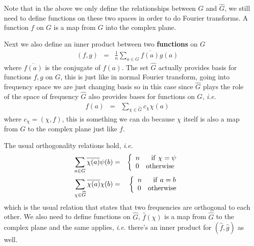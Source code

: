 \documentclass[aps,preprint,preprintnumbers,nofootinbib,showpacs,prd]{revtex4-1}
\newcommand{\ie}{{\it i.e.} }
\newcommand{\nbea}{\begin{eqnarray*}}
\newcommand{\neea}{\end{eqnarray*}}
\begin{document}
Note that in the above we only define the relationships between $G$ and $\widehat G$, we still need to define functions on these two spaces in order to do Fourier transforms. A function $f$ on $G$ is a map from $G$ into the complex plane.

Next we also define an inner product between two {\bf functions} on $G$
%
\nbea
(f,g) & = & \frac{1}{n} \sum_{a\in G} \overline{f(a)}g(a)
\neea
%
where $\overline{f(a)}$ is the conjugate of $f(a)$. The set $\widehat G$ actually provides basis for functions $f, g$ on $G$, this is just like in normal Fourier transform, going into frequency space we are just changing basis so in this case since $\widehat G$ plays the role of the space of frequency $\widehat G$ also provides bases for functions on $G$, \ie
%
\nbea
f(a) & = & \sum_{\chi \in \widehat G} c_\chi \chi(a)
\neea
%
where $c_\chi = (\chi, f)$, this is something we can do because $\chi$ itself is also a map from $G$ to the complex plane just like $f$.

The usual orthogonality relations hold, \ie
%
\nbea
\sum_{a\in G} \overline{\chi(a)} \psi(b) & = & \left \{
\begin{array}{l}
n {\rm ~~~~~if~} \chi=\psi \\
0~~~{\rm otherwise}
\end{array}
\right. \\
\sum_{\chi \in \widehat G} \overline{\chi(a)} \chi(b) & = & \left \{
\begin{array}{l}
n {\rm ~~~~~if~} a=b \\
0~~~{\rm otherwise}
\end{array}
\right.
\neea
%
which is the usual relation that states that two frequencies are orthogonal to each other. We also need to define functions on $\widehat G$, $\widehat f(\chi)$ is a map from $\widehat G$ to the complex plane and the same applies, \ie there's an inner product for $(\widehat f,\widehat g)$ as well.
\end{document}
